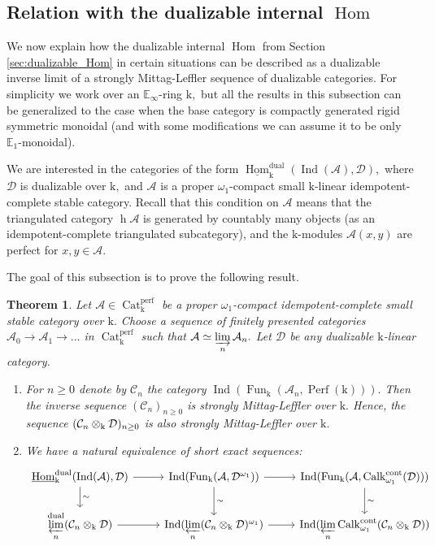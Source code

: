 \documentclass[11pt,leqno]{amsart}
\newtheorem{theo}{Theorem}[section]
\numberwithin{equation}{section}
\def\h{\operatorname{h}}
\def\Hom{\operatorname{Hom}}
\newcommand{\tens}[1]{%
  \mathbin{\mathop{\otimes}\displaylimits_{#1}}%
}
\newcommand{\indlim}[1][]{\mathop{\varinjlim}\limits_{#1}}
\newcommand{\prolim}[1][]{\mathop{\varprojlim}\limits_{#1}}
\newcommand{\Cat}{\operatorname{Cat}}
\newcommand{\cont}{\operatorname{cont}}
\newcommand{\dual}{\operatorname{dual}}
\newcommand{\bE}{{\mathbb E}}
\newcommand{\mk}{\mathrm k}
\newcommand{\cD}{{\mathcal D}}
\newcommand{\cA}{{\mathcal A}}
\newcommand{\cC}{{\mathcal C}}
\newcommand{\un}{\underline}
\newcommand{\Fun}{\operatorname{Fun}}
\newcommand{\Perf}{\operatorname{Perf}}
\newcommand{\perf}{\operatorname{perf}}
\newcommand{\Ind}{\operatorname{Ind}}
\newcommand{\Calk}{\operatorname{Calk}}
\begin{document}
\subsection{Relation with the dualizable internal $\Hom$}

We now explain how the dualizable internal $\Hom$ from Section \ref{sec:dualizable_Hom} in certain situations can be described as a dualizable inverse limit of a strongly Mittag-Leffler sequence of dualizable categories. For simplicity we work over an $\bE_{\infty}$-ring $\mk,$ but all the results in this subsection can be generalized to the case when the base category is compactly generated rigid symmetric monoidal (and with some modifications we can assume it to be only $\bE_1$-monoidal).

We are interested in the categories of the form $\un{\Hom}_{\mk}^{\dual}(\Ind(\cA),\cD),$ where $\cD$ is dualizable over $\mk,$ and $\cA$ is a proper $\omega_1$-compact small $\mk$-linear idempotent-complete stable category. Recall that this condition on $\cA$ means that the triangulated category $\h\cA$ is generated by countably many objects (as an idempotent-complete triangulated subcategory), and the $\mk$-modules $\cA(x,y)$ are perfect for $x,y\in\cA.$

The goal of this subsection is to prove the following result.

\begin{theo}\label{th:comparison_Hom^dual_with_ML}Let $\cA\in\Cat_{\mk}^{\perf}$ be a proper $\omega_1$-compact idempotent-complete small stable category over $\mk.$ Choose a sequence of finitely presented categories $\cA_0\to\cA_1\to\dots$ in $\Cat_{\mk}^{\perf}$ such that $\cA\simeq\indlim[n]\cA_n.$ Let $\cD$ be any dualizable $\mk$-linear category.
\begin{enumerate}[label=(\roman*), ref=(\roman*)]
\item For $n\geq 0$ denote by $\cC_n$ the category $\Ind(\Fun_{\mk}(\cA_n,\Perf(\mk))).$ Then the inverse sequence $(\cC_n)_{n\geq 0}$ is strongly Mittag-Leffler over $\mk.$ Hence, the sequence $(\cC_n\tens{\mk}\cD)_{n\geq 0}$ is also strongly Mittag-Leffler over $\mk.$ \label{Mittag-Leffler}

\item We have a natural equivalence of short exact sequences:
\begin{equation}
\label{eq:isom_of_ses}
\begin{tikzcd}
\un{\Hom}_{\mk}^{\dual}(\Ind(\cA),\cD)\ar[r]\ar[d, "\sim"] & \Ind(\Fun_{\mk}(\cA,\cD^{\omega_1}))\ar[r]\ar[d, "\sim"] & \Ind(\Fun_{\mk}(\cA,\Calk_{\omega_1}^{\cont}(\cD)))\ar[d, "\sim"]\\
\prolim[n]^{\dual}(\cC_n\tens{\mk}\cD)\ar[r] & \Ind(\prolim[n] (\cC_n\tens{\mk}\cD)^{\omega_1})\ar[r] & \Ind(\prolim[n]\Calk_{\omega_1}^{\cont}(\cC_n\tens{\mk}\cD))
\end{tikzcd}
\end{equation}\label{isom_of_ses}
\end{enumerate}\end{theo}
\end{document}
